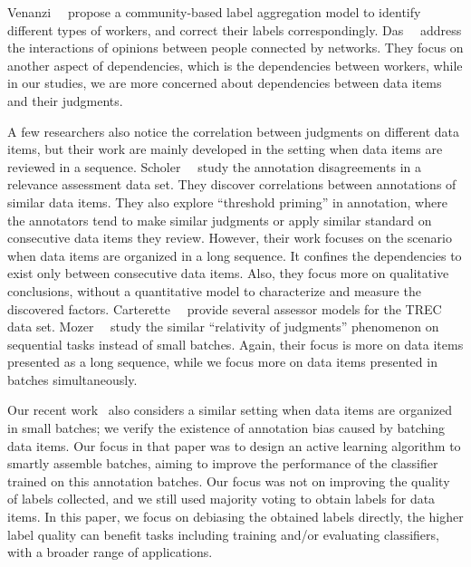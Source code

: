 Venanzi~\etal~\cite{venanzi:www2014} propose a community-based label aggregation model to identify different types of workers, 
and correct their labels correspondingly.  
Das~\etal~\cite{das:kdd2013} address the interactions of opinions between people connected by networks.
They focus on another aspect of dependencies, 
which is the dependencies between workers, 
while in our studies, we are more concerned about dependencies between data items and their judgments.  



A few researchers also notice the correlation between judgments on different data items, 
but their work are mainly developed in the setting when data items are reviewed in a sequence.  
Scholer~\etal~\cite{scholer:sigir2013,scholer:sigir2011} study the annotation disagreements in 
a relevance assessment data set.  
They discover correlations between annotations of similar data items.  %
They also explore ``threshold priming'' in annotation, 
where the annotators tend to make similar judgments or apply similar standard on consecutive data items they review. 
However, their work focuses on the scenario when data items are organized in a long sequence.  
It confines the dependencies to exist only between consecutive data items.  
Also, they focus more on qualitative conclusions, without a quantitative model to characterize and measure the discovered factors.  
Carterette~\etal~\cite{carterette:effect2010} provide several assessor models for the TREC data set.  
Mozer~\etal~\cite{mozer:nips2010} study the similar ``relativity of
judgments'' phenomenon on sequential tasks instead of small batches.  
Again, their focus is more on data items presented as a long sequence, 
while we focus more on data items presented in batches simultaneously.  

Our recent work~\cite{zhuang:wsdm2015} also considers a similar setting 
when data items are organized in small batches; 
we verify the existence of annotation bias caused by batching data items.  
Our focus in that paper was to design an active learning algorithm to smartly assemble batches, 
aiming to improve the performance of the classifier trained on this annotation batches.  
Our focus was not on improving the quality of labels collected, 
and we still used majority voting to obtain labels for data items.  
In this paper, we focus on debiasing the obtained labels directly,
the higher label quality can benefit tasks including training and/or evaluating classifiers, 
with a broader range of applications.

